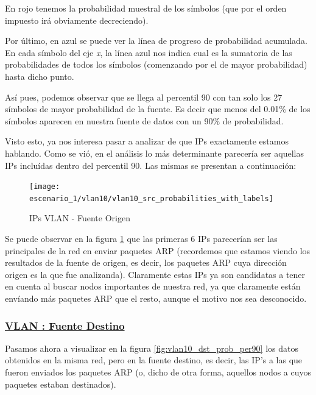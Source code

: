 \par En rojo tenemos la probabilidad muestral de los s\'imbolos (que por el orden impuesto
ir\'a obviamente decreciendo).

\par Por \'ultimo, en azul se puede ver la l\'inea de progreso de probabilidad acumulada.
En cada s\'imbolo del eje \textit{x}, la l\'inea azul nos indica cual es la sumatoria de
las probabilidades de todos los s\'imbolos (comenzando por el de mayor probabilidad) hasta
dicho punto.\\

\par As\'i pues, podemos observar que se llega al percentil 90 con tan solo los 27 s\'imbolos
de mayor probabilidad de la fuente. Es decir que menos del 0.01\% de los s\'imbolos aparecen
en nuestra fuente de datos con un 90\% de probabilidad.

\par Visto esto, ya nos interesa pasar a analizar de que IPs exactamente estamos hablando.
Como se vi\'o, en el an\'alisis lo m\'as determinante parecer\'ia ser aquellas IPs inclu\'idas
dentro del percentil 90. Las mismas se presentan a continuaci\'on:

\begin{figure}[!ht]
    \centering
    \texttt{[image: escenario\_1/vlan10/vlan10\_src\_probabilities\_with\_labels]}
    \caption{IPs VLAN  - Fuente Origen}
    \label{fig:vlan10_src_prob_ips}
\end{figure}

\par Se puede observar en la figura \ref{fig:vlan10_src_prob_ips} que las primeras 6 IPs parecer\'ian
ser las principales de la red en enviar paquetes ARP (recordemos que estamos viendo los resultados
de la fuente de origen, es decir, los paquetes ARP cuya direcci\'on origen es la que fue
analizanda). Claramente estas IPs ya son candidatas a tener en cuenta al buscar nodos importantes
de nuestra red, ya que claramente est\'an env\'iando m\'as paquetes ARP que el resto, aunque el
motivo nos sea desconocido.


\subsubsection*{\underline{VLAN : Fuente Destino}}\label{subsubsec:vlan10_dst}
\par Pasamos ahora a visualizar en la figura \ref{fig:vlan10_dst_prob_per90} los datos obtenidos
en la misma red, pero en la fuente destino, es decir, las IP's a las que fueron enviados los
paquetes ARP (o, dicho de otra forma, aquellos nodos a cuyos paquetes estaban destinados).

